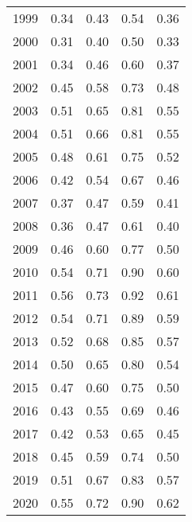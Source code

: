 \documentclass[11pt]{book}
\begin{document}
\begin{longtable}[]{@{}lrrrr@{}}
1999 & 0.34 & 0.43 & 0.54 & 0.36\tabularnewline
2000 & 0.31 & 0.40 & 0.50 & 0.33\tabularnewline
2001 & 0.34 & 0.46 & 0.60 & 0.37\tabularnewline
2002 & 0.45 & 0.58 & 0.73 & 0.48\tabularnewline
2003 & 0.51 & 0.65 & 0.81 & 0.55\tabularnewline
2004 & 0.51 & 0.66 & 0.81 & 0.55\tabularnewline
2005 & 0.48 & 0.61 & 0.75 & 0.52\tabularnewline
2006 & 0.42 & 0.54 & 0.67 & 0.46\tabularnewline
2007 & 0.37 & 0.47 & 0.59 & 0.41\tabularnewline
2008 & 0.36 & 0.47 & 0.61 & 0.40\tabularnewline
2009 & 0.46 & 0.60 & 0.77 & 0.50\tabularnewline
2010 & 0.54 & 0.71 & 0.90 & 0.60\tabularnewline
2011 & 0.56 & 0.73 & 0.92 & 0.61\tabularnewline
2012 & 0.54 & 0.71 & 0.89 & 0.59\tabularnewline
2013 & 0.52 & 0.68 & 0.85 & 0.57\tabularnewline
2014 & 0.50 & 0.65 & 0.80 & 0.54\tabularnewline
2015 & 0.47 & 0.60 & 0.75 & 0.50\tabularnewline
2016 & 0.43 & 0.55 & 0.69 & 0.46\tabularnewline
2017 & 0.42 & 0.53 & 0.65 & 0.45\tabularnewline
2018 & 0.45 & 0.59 & 0.74 & 0.50\tabularnewline
2019 & 0.51 & 0.67 & 0.83 & 0.57\tabularnewline
2020 & 0.55 & 0.72 & 0.90 & 0.62\tabularnewline
\bottomrule
\end{longtable}
\clearpage
\end{document}
